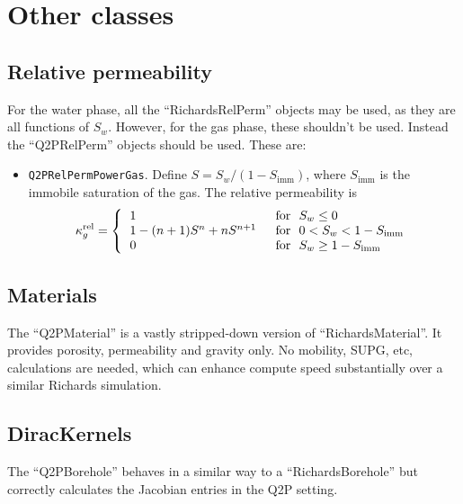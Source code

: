 \documentclass[]{scrreprt}
\begin{document}
\begin{itemize}
\end{itemize}


\section{Other classes}

\subsection{Relative permeability}

For the water phase, all the ``RichardsRelPerm'' objects may be
used, as they are all functions of $S_{w}$.  However, for the gas
phase, these shouldn't be used.  Instead the ``Q2PRelPerm'' objects
should be used.  These are:

\begin{itemize}
\item {\tt Q2PRelPermPowerGas}.  Define $S = S_{w}/(1 -
  S_{\mathrm{imm}})$, where $S_{\mathrm{imm}}$ is the immobile
  saturation of the gas.  The relative permeability is
\begin{equation}
\kappa_{g}^{\mathrm{rel}} = \left\{
\begin{tabular}{ll}
1 & \mbox{ for } $S_{w} \leq 0$ \\
$1 - (n+1)S^{n} + nS^{n+1}$ & \mbox{ for } $0 < S_{w} < 1 -
S_{\mathrm{imm}}$ \\
0 & \mbox{ for } $S_{w} \geq 1 - S_{\mathrm{imm}}$ \\
\end{tabular}
\right.
\end{equation}

\end{itemize}


\subsection{Materials}

The ``Q2PMaterial'' is a vastly stripped-down version of
``RichardsMaterial''.  It provides porosity, permeability and gravity
only.  No mobility, SUPG, etc, calculations are needed, which can
enhance compute speed substantially over a similar Richards
simulation.



\subsection{DiracKernels}

The ``Q2PBorehole'' behaves in a similar way to a
``RichardsBorehole'' but correctly calculates the Jacobian entries in
the Q2P setting.
\end{document}
